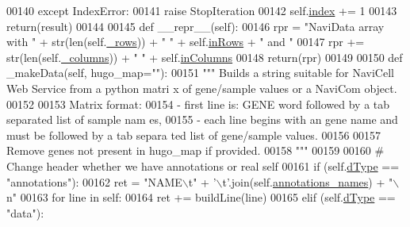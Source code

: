 \begin{DoxyCode}
00140         \textcolor{keywordflow}{except} IndexError:
00141             \textcolor{keywordflow}{raise} StopIteration
00142         self.\hyperlink{classnavicom_1_1navidata_1_1NaviData_adb2e7ce6c9a691a186d91d4a8d49864a}{index} += 1
00143         \textcolor{keywordflow}{return}(result)
00144 
00145     \textcolor{keyword}{def }\_\_repr\_\_(self):
00146         rpr = \textcolor{stringliteral}{"NaviData array with "} + str(len(self.\hyperlink{classnavicom_1_1navidata_1_1NaviData_a441bab93a769704074bba0c383b16986}{_rows})) + \textcolor{stringliteral}{" "} + self.\hyperlink{classnavicom_1_1navidata_1_1NaviData_a172b33d53b897135381a92b045f5576b}{inRows} +
       \textcolor{stringliteral}{" and "}
00147         rpr += str(len(self.\hyperlink{classnavicom_1_1navidata_1_1NaviData_a1f3211f361097ad745c4a6c8f74887cf}{_columns})) + \textcolor{stringliteral}{" "} + self.\hyperlink{classnavicom_1_1navidata_1_1NaviData_a080320f0715d257f61490985484e6d54}{inColumns}
00148         \textcolor{keywordflow}{return}(rpr)
00149 
00150     \textcolor{keyword}{def }\_makeData(self, hugo\_map=""):
00151         \textcolor{stringliteral}{""" Builds a string suitable for NaviCell Web Service from a python matri
      x of gene/sample values or a NaviCom object.}
00152 \textcolor{stringliteral}{}
00153 \textcolor{stringliteral}{        Matrix format:}
00154 \textcolor{stringliteral}{        - first line is: GENE word followed by a tab separated list of sample nam
      es,}
00155 \textcolor{stringliteral}{        - each line begins with an gene name and must be followed by a tab separa
      ted list of gene/sample values.}
00156 \textcolor{stringliteral}{}
00157 \textcolor{stringliteral}{        Remove genes not present in hugo\_map if provided.}
00158 \textcolor{stringliteral}{        """}
00159 
00160         \textcolor{comment}{# Change header whether we have annotations or real self}
00161         \textcolor{keywordflow}{if} (self.\hyperlink{classnavicom_1_1navidata_1_1NaviData_a89cf0727f26dba8aabb38271d85b169d}{dType} == \textcolor{stringliteral}{"annotations"}):
00162             ret = \textcolor{stringliteral}{"NAME\(\backslash\)t"} + \textcolor{stringliteral}{'\(\backslash\)t'}.join(self.\hyperlink{classnavicom_1_1navidata_1_1NaviData_aae9bfcdefa67abad304df58b7e4a62c8}{annotations_names}) + \textcolor{stringliteral}{"\(\backslash\)n"}
00163             \textcolor{keywordflow}{for} line \textcolor{keywordflow}{in} self:
00164                 ret += buildLine(line)
00165         \textcolor{keywordflow}{elif} (self.\hyperlink{classnavicom_1_1navidata_1_1NaviData_a89cf0727f26dba8aabb38271d85b169d}{dType} == \textcolor{stringliteral}{"data"}):

\end{DoxyCode}
